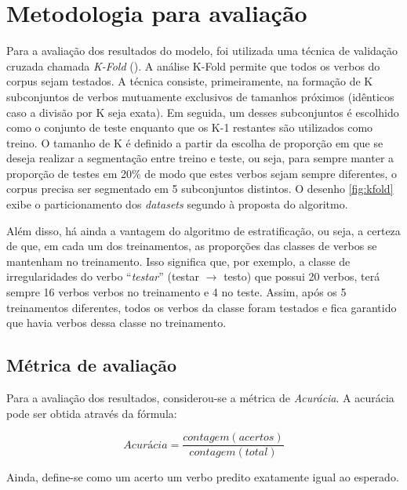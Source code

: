 \section{Metodologia para avaliação}
\label{sec:method}

 Para a avaliação dos resultados do modelo, foi utilizada uma técnica de validação cruzada chamada \textit{K-Fold} (\cite{kfold:2018}). A análise K-Fold permite que todos os verbos do corpus sejam testados. A técnica consiste, primeiramente, na formação de K subconjuntos de verbos mutuamente exclusivos de tamanhos próximos (idênticos caso a divisão por K seja exata). Em seguida, um desses subconjuntos é escolhido como o conjunto de teste enquanto que os K-1 restantes são utilizados como treino. O tamanho de K é definido a partir da escolha de proporção em que se deseja realizar a segmentação entre treino e teste, ou seja, para sempre manter a proporção de testes em 20\% de modo que estes verbos sejam sempre diferentes, o corpus precisa ser segmentado em 5 subconjuntos distintos. O desenho \ref{fig:kfold} exibe o particionamento dos \textit{datasets} segundo à proposta do algoritmo. 



Além disso, há ainda a vantagem do algoritmo de estratificação, ou seja, a certeza de que, em cada um dos treinamentos, as proporções das classes de verbos se mantenham no treinamento. Isso significa que, por exemplo, a classe de irregularidades do verbo “\textit{testar}” (testar $\rightarrow$ testo) que possui 20 verbos, terá sempre 16 verbos verbos no treinamento e 4 no teste. Assim, após os 5 treinamentos diferentes, todos os verbos da classe foram testados e fica garantido que havia verbos dessa classe no treinamento.

\subsection{Métrica de avaliação}

Para a avaliação dos resultados, considerou-se a métrica de \textit{Acurácia}. A acurácia pode ser obtida através da fórmula:

\begin{equation}
    Acurácia = \frac{contagem(acertos)}{contagem(total)}
\end{equation}

Ainda, define-se como um acerto um verbo predito exatamente igual ao esperado.

